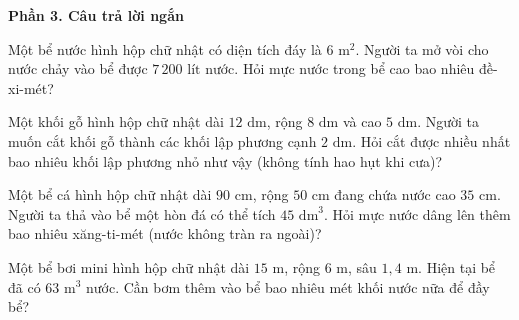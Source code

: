 \textbf{Phần 3. Câu trả lời ngắn}

\begin{ex} %
Một bể nước hình hộp chữ nhật có diện tích đáy là $6\text{ m}^2$. Người ta mở vòi cho nước chảy vào bể được $7\,200\text{ lít}$ nước. Hỏi mực nước trong bể cao bao nhiêu đề-xi-mét?
\end{ex}

\begin{ex} %
Một khối gỗ hình hộp chữ nhật dài $12\text{ dm}$, rộng $8\text{ dm}$ và cao $5\text{ dm}$. Người ta muốn cắt khối gỗ thành các khối lập phương cạnh $2\text{ dm}$. Hỏi cắt được nhiều nhất bao nhiêu khối lập phương nhỏ như vậy (không tính hao hụt khi cưa)?
\end{ex}

\begin{ex} %
Một bể cá hình hộp chữ nhật dài $90\text{ cm}$, rộng $50\text{ cm}$ đang chứa nước cao $35\text{ cm}$. Người ta thả vào bể một hòn đá có thể tích $45\text{ dm}^3$. Hỏi mực nước dâng lên thêm bao nhiêu xăng-ti-mét (nước không tràn ra ngoài)?
\end{ex}

\begin{ex} %
Một bể bơi mini hình hộp chữ nhật dài $15\text{ m}$, rộng $6\text{ m}$, sâu $1{,}4\text{ m}$. Hiện tại bể đã có $63\text{ m}^3$ nước. Cần bơm thêm vào bể bao nhiêu mét khối nước nữa để đầy bể?
\end{ex}


